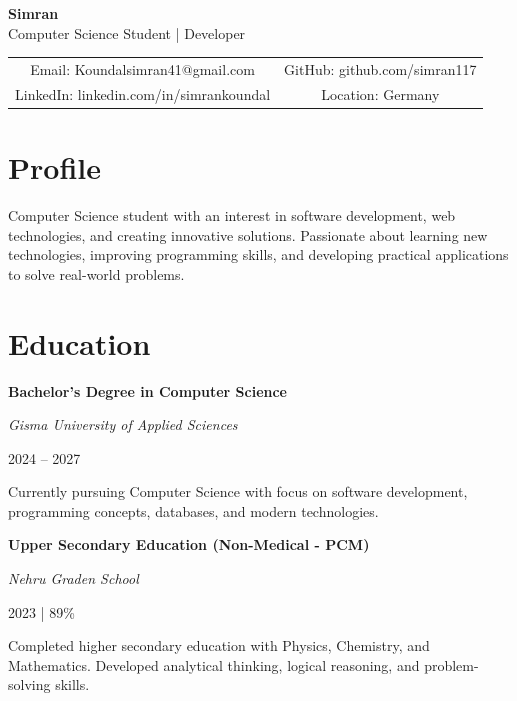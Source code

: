 \documentclass[11pt,a4paper]{article}
\begin{document}
\begin{center}

{\Huge \textbf{Simran}}\\[6pt]

{\large Computer Science Student | Developer}\\[10pt]


\begin{tabular}{c c}

Email: Koundalsimran41@gmail.com 
&
GitHub: github.com/simran117

\\[6pt]

LinkedIn: linkedin.com/in/simrankoundal
&
Location: Germany

\end{tabular}


\end{center}



\section*{Profile}

Computer Science student with an interest in software development, 
web technologies, and creating innovative solutions. 
Passionate about learning new technologies, improving programming skills,
and developing practical applications to solve real-world problems.



\section*{Education}


\textbf{Bachelor's Degree in Computer Science}

\textit{Gisma University of Applied Sciences}

\hfill 2024 -- 2027


Currently pursuing Computer Science with focus on software development,
programming concepts, databases, and modern technologies.



\vspace{8pt}



\textbf{Upper Secondary Education (Non-Medical - PCM)}

\textit{Nehru Graden School}

\hfill 2023 | 89\%


Completed higher secondary education with Physics, Chemistry, and Mathematics.
Developed analytical thinking, logical reasoning, and problem-solving skills.
\end{document}

